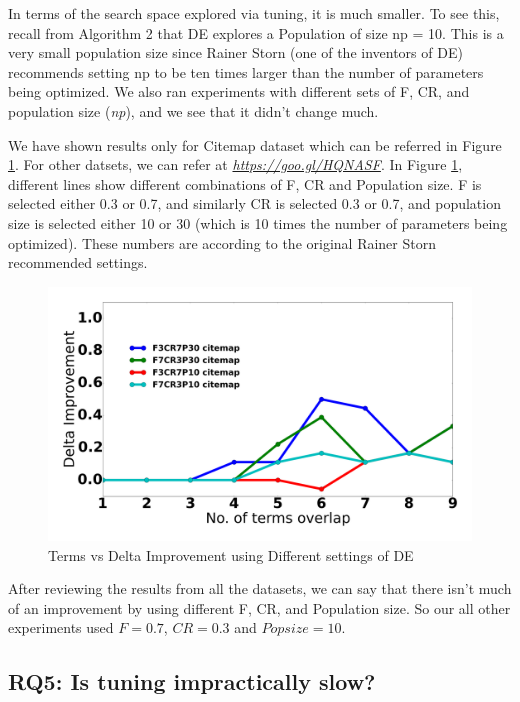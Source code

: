 \documentclass[conference]{IEEEtran}
\theoremstyle{break}
\begin{document}
In terms of the search space explored via tuning, it is much smaller. To see this, recall from Algorithm 2 that DE explores a Population of size np = 10. This is a very small population size since Rainer Storn (one of the inventors of DE) recommends setting np to be ten times larger than the number of parameters being optimized. We also ran experiments with different sets of F, CR, and population size (\textit{np}), and we see that it didn't change much.

We have shown results only for Citemap dataset which can be referred in Figure \ref{fig:RQ4}. For other datsets, we can refer at \href{https://goo.gl/HQNASF}{\textit{https://goo.gl/HQNASF}}. In Figure \ref{fig:RQ4}, different lines show different combinations of F, CR and Population size. F is selected either 0.3 or 0.7, and similarly CR is selected 0.3 or 0.7, and population size is selected either 10 or 30 (which is 10 times the number of parameters being optimized). These numbers are according to the original Rainer Storn~\cite{storn1997differential} recommended settings.

\begin{figure}[!htbp]
  \includegraphics[width=\linewidth]{./fig/citemap.png}
  \caption{Terms vs Delta Improvement using Different settings of DE}
  \label{fig:RQ4}
\end{figure}

After reviewing the results from all the datasets, we can say that there isn't much of an improvement by using different F, CR, and Population size. So our all other experiments used $F=0.7$, $CR=0.3$ and $Pop size = 10$.

\subsection{\textbf{RQ5: Is tuning impractically slow?}}
\end{document}
